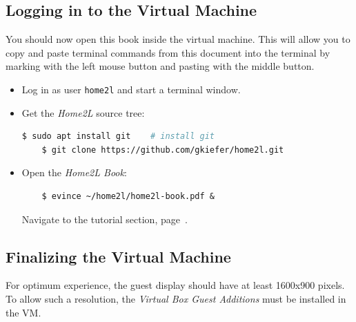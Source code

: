 \documentclass[12pt,english,parskip=half]{scrreprt}
\begin{document}
\subsection{Logging in to the Virtual Machine}
\label{sec:tutorial-vm-login}


You should now open this book inside the virtual machine.
This will allow you to copy and paste terminal commands from this document into the terminal
by marking with the left mouse button and pasting with the middle button.


\begin{itemize}[$\blacktriangleright$]

\item
  Log in as user \texttt{home2l} and start a terminal window.

\item
  Get the \emph{Home2L} source tree:
  \begin{lstlisting}[language=bash]
    $ sudo apt install git    # install git
    $ git clone https://github.com/gkiefer/home2l.git
  \end{lstlisting}

\item
  Open the \emph{Home2L Book}:
  \begin{lstlisting}
    $ evince ~/home2l/home2l-book.pdf &
  \end{lstlisting}
  Navigate to the tutorial section, page~\thepage.

\end{itemize}



\subsection{Finalizing the Virtual Machine}
\label{sec:tutorial-vm-guestadditions}

For optimum experience, the guest display should have at least 1600x900 pixels.
To allow such a resolution, the \emph{Virtual Box Guest Additions} must be installed in the VM.
\end{document}
